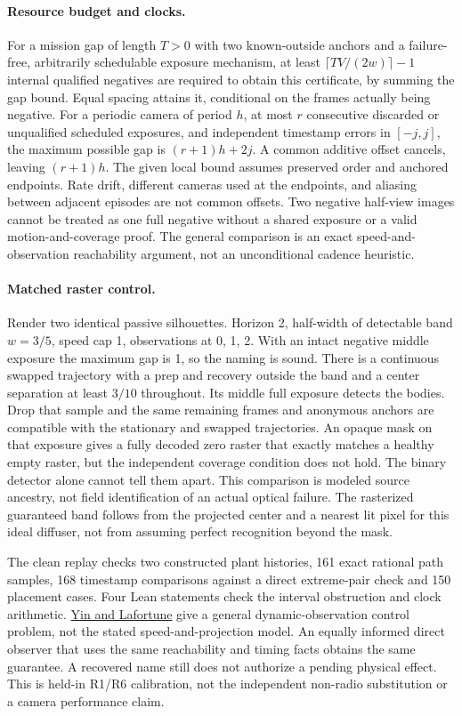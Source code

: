 \documentclass{article}
\begin{document}
\paragraph{Resource budget and clocks.}
For a mission gap of length $T>0$ with two known-outside anchors and
a failure-free, arbitrarily schedulable exposure mechanism, at least
$\lceil TV/(2w)\rceil-1$ internal qualified negatives are required to
obtain this certificate, by summing the gap bound. Equal spacing
attains it, conditional on the frames actually being negative.
For a periodic camera of period $h$, at most $r$ consecutive discarded
or unqualified scheduled exposures, and independent timestamp errors
in $[-j,j]$, the maximum possible gap is $(r+1)h+2j$.
A common additive offset cancels, leaving $(r+1)h$.
The given local bound assumes preserved order and anchored endpoints.
Rate drift, different cameras used at the endpoints, and aliasing
between adjacent episodes are not common offsets. Two negative
half-view images cannot be treated as one full negative without a
shared exposure or a valid motion-and-coverage proof. The general
comparison is an exact speed-and-observation reachability argument,
not an unconditional cadence heuristic.

\paragraph{Matched raster control.}
Render two identical passive silhouettes. Horizon 2, half-width of
detectable band $w=3/5$, speed cap 1, observations at 0, 1, 2.
With an intact negative middle exposure the maximum gap is 1, so
the naming is sound. There is a continuous swapped trajectory with
a prep and recovery outside the band and a center separation at
least $3/10$ throughout. Its middle full exposure detects the
bodies. Drop that sample and the same remaining frames and anonymous
anchors are compatible with the stationary and swapped trajectories.
An opaque mask on that exposure gives a fully decoded zero raster
that exactly matches a healthy empty raster, but the independent
coverage condition does not hold. The binary detector alone cannot
tell them apart. This comparison is modeled source ancestry, not
field identification of an actual optical failure.
The rasterized guaranteed band follows from the projected center
and a nearest lit pixel for this ideal diffuser, not from assuming
perfect recognition beyond the mask.

The clean replay checks two constructed plant histories, 161 exact
rational path samples, 168 timestamp comparisons against a direct
extreme-pair check and 150 placement cases. Four Lean statements
check the interval obstruction and clock arithmetic.
\href{https://www.sciencedirect.com/science/article/pii/S0005109815003490}{Yin and Lafortune}
give a general dynamic-observation control problem, not the stated
speed-and-projection model. An equally informed direct observer that
uses the same reachability and timing facts obtains the same guarantee.
A recovered name still does not authorize a pending physical effect.
This is held-in R1/R6 calibration, not the independent non-radio
substitution or a camera performance claim.
\end{document}
